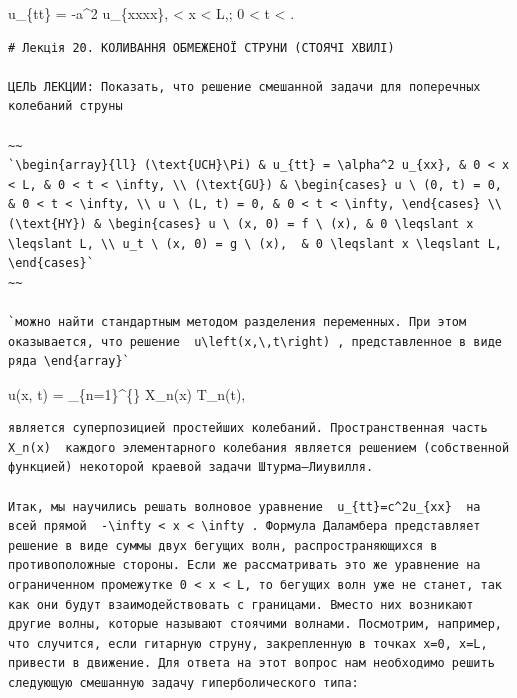 \documentclass[
  ukrainian,
]{article}
\begin{document}
u\_\{tt\} = -a\^{}2 u\_\{xxxx\},  \textless{} x \textless{} L,;
0 \textless{} t \textless{} \infty.

\begin{verbatim}
# Лекція 20. КОЛИВАННЯ ОБМЕЖЕНОЇ СТРУНИ (СТОЯЧІ ХВИЛІ)

ЦЕЛЬ ЛЕКЦИИ: Показать, что решение смешанной задачи для поперечных колебаний струны

~~
`\begin{array}{ll} (\text{UCH}\Pi) & u_{tt} = \alpha^2 u_{xx}, & 0 < x < L, & 0 < t < \infty, \\ (\text{GU}) & \begin{cases} u \ (0, t) = 0, & 0 < t < \infty, \\ u \ (L, t) = 0, & 0 < t < \infty, \end{cases} \\ (\text{HY}) & \begin{cases} u \ (x, 0) = f \ (x), & 0 \leqslant x \leqslant L, \\ u_t \ (x, 0) = g \ (x),  & 0 \leqslant x \leqslant L, \end{cases}`
~~

`можно найти стандартным методом разделения переменных. При этом оказывается, что решение  u\left(x,\,t\right) , представленное в виде ряда \end{array}`
\end{verbatim}

u(x, t) = \sum\_\{n=1\}\^{}\{\infty\} X\_n(x) T\_n(t),

\begin{verbatim}
является суперпозицией простейших колебаний. Пространственная часть  X_n(x)  каждого элементарного колебания является решением (собственной функцией) некоторой краевой задачи Штурма—Лиувилля.

Итак, мы научились решать волновое уравнение  u_{tt}=c^2u_{xx}  на всей прямой  -\infty < x < \infty . Формула Даламбера представляет решение в виде суммы двух бегущих волн, распространяющихся в противоположные стороны. Если же рассматривать это же уравнение на ограниченном промежутке 0 < x < L, то бегущих волн уже не станет, так как они будут взаимодействовать с границами. Вместо них возникают другие волны, которые называют стоячими волнами. Посмотрим, например, что случится, если гитарную струну, закрепленную в точках x=0, x=L, привести в движение. Для ответа на этот вопрос нам необходимо решить следующую смешанную задачу гиперболического типа:
\end{verbatim}
\end{document}
